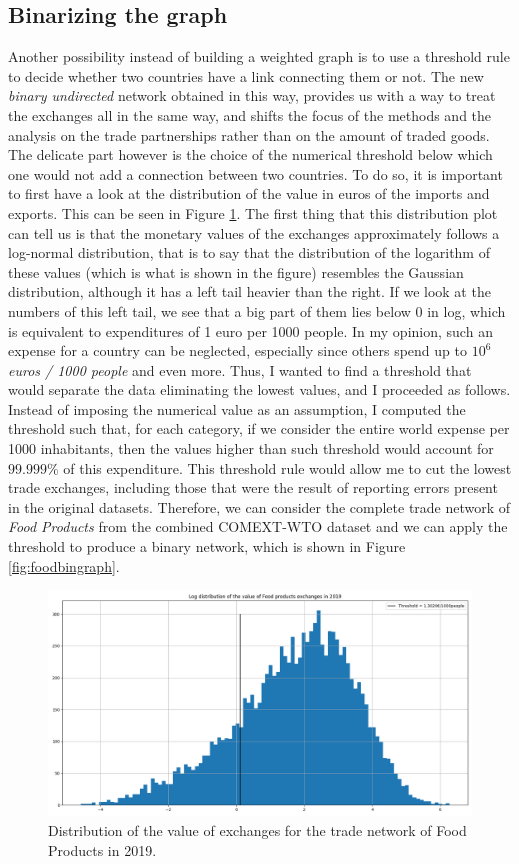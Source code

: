 \subsection{Binarizing the graph}
Another possibility instead of building a weighted graph is to use a threshold rule to decide whether two countries have a link connecting them or not. The new \textit{binary undirected} network obtained in this way, provides us with a way to treat the exchanges all in the same way, and shifts the focus of the methods and the analysis on the trade partnerships rather than on the amount of traded goods. The delicate part however is the choice of the numerical threshold below which one would not add a connection between two countries. To do so, it is important to first have a look at the distribution of the value in euros of the imports and exports. This can be seen in Figure \ref{fig:distrfood19}. 
The first thing that this distribution plot can tell us is that the monetary values of the exchanges approximately follows a log-normal distribution, that is to say that the distribution of the logarithm of these values (which is what is shown in the figure) resembles the Gaussian distribution, although it has a left tail heavier than the right. If we look at the numbers of this left tail, we see that a big part of them lies below 0 in log, which is equivalent to expenditures of 1 euro per 1000 people.
In my opinion, such an expense for a country can be neglected, especially since others spend up to $10^6$ \textit{euros / 1000 people} and even more. Thus, I wanted to find a threshold that would separate the data eliminating the lowest values, and I proceeded as follows. Instead of imposing the numerical value as an assumption, I computed the threshold such that, for each category, if we consider the entire world expense per 1000 inhabitants, then the values higher than such threshold would account for $99.999\%$ of this expenditure. This threshold rule would allow me to cut the lowest trade exchanges, including those that were the result of reporting errors present in the original datasets. Therefore, we can consider the complete trade network of \textit{Food Products} from the combined COMEXT-WTO dataset and we can apply the threshold to produce a binary network, which is shown in Figure \ref{fig:foodbingraph}.
\begin{figure}[h]
    \centering
    \includegraphics[width=\textwidth]{pics/thresh_complete_y19_p10.png}
    \caption{Distribution of the value of exchanges for the trade network of Food Products in 2019.}
    \label{fig:distrfood19}
\end{figure}

